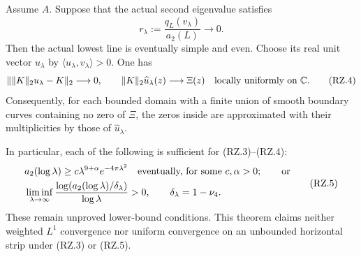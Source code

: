 \begin{theorem}
\label{AC-S48}
Assume \(A\).  Suppose that the actual second eigenvalue satisfies
\[
 r_\lambda:=\frac{q_L(v_\lambda)}{a_2(L)}
                    \longrightarrow0.
 \tag{RZ.3}
\]
Then the actual lowest line is eventually simple and even.  Choose its
real unit vector \(u_\lambda\) by
\(\langle u_\lambda,v_\lambda\rangle>0\).  One has
\[
 \|\|K\|_2u_\lambda-K\|_2\longrightarrow0,
 \qquad
 \|K\|_2\widehat u_\lambda(z)\longrightarrow\Xi(z)
         \quad\hbox{locally uniformly on }\mathbb C.
 \tag{RZ.4}
\]
Consequently, for each bounded domain with a finite union of smooth
boundary curves containing no zero of \(\Xi\), the zeros inside are
approximated with their multiplicities by those of
\(\widehat u_\lambda\).

In particular, each of the following is sufficient for (RZ.3)--(RZ.4):
\[
 \begin{split}
 &a_2(\log\lambda)\ge c\lambda^{9+\alpha}e^{-4\pi\lambda^2}
       \quad\hbox{eventually, for some }c,\alpha>0;\qquad\hbox{or}\\
 &\liminf_{\lambda\to\infty}
   \frac{\log(a_2(\log\lambda)/\delta_\lambda)}{\log\lambda}>0,
             \qquad\delta_\lambda=1-\nu_4.
 \end{split}
 \tag{RZ.5}
\]
These remain unproved lower-bound conditions.  This theorem claims
neither weighted \(L^1\) convergence nor uniform convergence on an
unbounded horizontal strip under (RZ.3) or (RZ.5).
\end{theorem}

